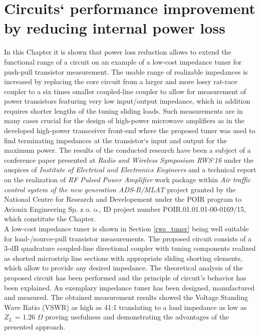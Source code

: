 \chapter{Circuits` performance improvement by reducing internal power loss}\label{front}

\indent In this Chapter it is shown that power loss reduction allows to extend the functional range of a circuit on an example of a low-cost impedance tuner for push-pull transistor measurement. The usable range of realizable impedances is increased by replacing the core circuit from a larger and more lossy rat-race coupler to a six times smaller coupled-line coupler  to allow for measurement of power transistors featuring very low input/output impedance, which in addition requires shorter lengths of the tuning sliding loads. Such measurements are in many cases crucial for the design of high-power microwave amplifiers as in the developed high-power transceiver front-end where the proposed tuner was used to find  terminating impedances at the transistor`s input and output for the maximum power. The results of the conducted research have been a subject of a conference paper presented at \textit{Radio and Wireless Symposium RWS`16} under the auspices of \textit{Institute of Electrical and Electronics Engineers} and a technical report on the realization of \textit{RF Pulsed Power Amplifier} work package within \textit{Air traffic control system of the new generation ADS-B/MLAT} project granted by the National Centre for Research and Developement under the POIR program to Avionix Engineering Sp. z o. o., ID project number POIR.01.01.01-00-0169/15, which constitute the Chapter.
\\
\indent A low-cost impedance tuner is shown in Section \ref{rws_tuner} being well suitable for load-/source-pull transistor measurements. The proposed circuit consists of a 3-dB quadrature coupled-line directional coupler with tuning components realized as shorted microstrip line sections with appropriate sliding shorting elements, which allow to provide any desired impedance. The theoretical analysis of the proposed circuit has been performed and the principle of circuit’s behavior has been explained. An exemplary impedance tuner has been designed, manufactured and measured. The obtained measurement results showed the Voltage Standing Wave Ratio (VSWR) as high as 41:1 translating to a load impedance as low as $Z_{L}$ = 1.26 $\Omega $ proving usefulness and demonstrating the advantages of the presented approach.
